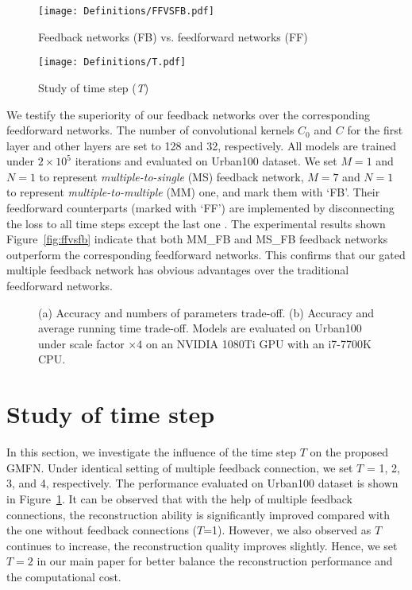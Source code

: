 \documentclass{bmvc2k}
\begin{document}
\begin{figure}[htbp]
	\begin{minipage}[t]{0.5\linewidth}
		\centering
		\texttt{[image: Definitions/FFVSFB.pdf]}
		\caption{Feedback networks (FB) vs. feedforward networks (FF)}
		\label{fig:ffvsfb}
	\end{minipage}\begin{minipage}[t]{0.5\linewidth}
		\centering
		\texttt{[image: Definitions/T.pdf]}
		\caption{Study of time step (\textit{T})}
		\label{fig:st}
	\end{minipage}
\end{figure}


 We testify the superiority of our feedback networks over the corresponding feedforward networks. The number of convolutional kernels $C_{0}$ and $C$ for the first layer and other layers are set to 128 and 32, respectively. All models are trained under $2\times10^{5}$ iterations and evaluated on Urban100 dataset. We set $M=1$ and $N=1$ to represent \textit{multiple-to-single} (MS) feedback network, $M=7$ and $N=1$ to represent \textit{multiple-to-multiple} (MM) one, and mark them with `FB'. Their feedforward counterparts (marked with `FF') are implemented by disconnecting the loss to all time steps except the last one \cite{zamir2017feedback, li2019srfbn}. The experimental results shown Figure~\ref{fig:ffvsfb} indicate that both MM\_FB and MS\_FB feedback networks outperform the corresponding feedforward networks. This confirms that our gated multiple feedback network has obvious advantages over the traditional feedforward networks. 

\begin{figure}
	\centering
	\caption{(a) Accuracy and numbers of parameters trade-off. (b) Accuracy and average running time trade-off. Models are evaluated on Urban100 under scale factor $\times 4$ on an NVIDIA 1080Ti GPU with an i7-7700K CPU.}
	\label{fig:ma}
\end{figure}

\section{Study of time step}
\label{sec:sot}

In this section, we investigate the influence of the time step $T$ on the proposed GMFN. Under identical setting of multiple feedback connection, we set $T$ = 1, 2, 3, and 4, respectively. The performance evaluated on Urban100 dataset is shown in Figure~\ref{fig:st}. It can be observed that with the help of multiple feedback connections, the reconstruction ability is significantly improved compared with the one without feedback connections ($T$=1). However, we also observed as $T$ continues to increase, the reconstruction quality improves slightly. Hence, we set $T=2$ in our main paper for better balance the reconstruction performance and the computational cost. 
\end{document}
